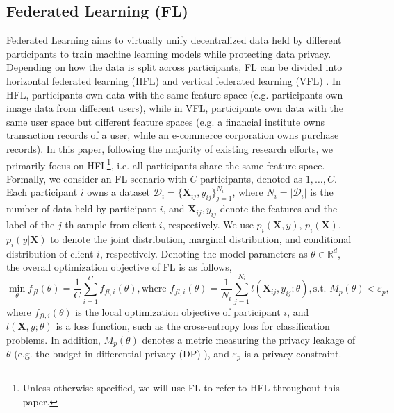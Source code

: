 \documentclass[11pt]{article}
\begin{document}
\subsection{Federated Learning (FL)}\label{sec:prelim-fl}
Federated Learning aims to virtually unify decentralized data held by different participants to train machine learning models while protecting data privacy. Depending on how the data is split across participants, FL can be divided into horizontal federated learning (HFL) and vertical federated learning (VFL) \cite{Yilun-yang2019federated}. In HFL, participants own data with the same feature space (e.g. participants own image data from different users), while in VFL, participants own data with the same user space but different feature spaces (e.g. a financial institute owns transaction records of a user, while an e-commerce corporation owns purchase records). In this paper, following the majority of existing research efforts, we primarily focus on HFL\footnote{Unless otherwise specified, we will use FL to refer to HFL throughout this paper. }, i.e. all participants share the same feature space. Formally, we consider an FL scenario with $C$ participants, denoted as $1, \dots, C$. Each participant $i$ owns a dataset $\mathcal{D}_i=\{\mathbf{X}_{ij}, y_{ij}\}_{j=1}^{N_i}$, where $N_i=|\mathcal{D}_i|$ is the number of data held by participant $i$, and $\mathbf{X}_{ij}, y_{ij}$ denote the features and the label of the $j$-th sample from client $i$, respectively. We use $p_i(\mathbf{X}, y)$, $p_i(\mathbf{X})$, $p_i(y|\mathbf{X})$ to denote the joint distribution, marginal distribution, and conditional distribution of client $i$, respectively. Denoting the model parameters as $\theta\in \mathbb{R}^d$, the overall optimization objective of FL is as follows,
\begin{equation}
    \min_{\theta} f_{fl}(\theta) = \frac{1}{C}\sum_{i=1}^C f_{fl, i}(\theta), \text{where } f_{fl, i}(\theta) =\frac{1}{N_i}\sum_{j=1}^{N_i}l\left(\mathbf{X}_{ij}, y_{ij};\theta\right), \text{s.t. } M_p(\theta)< \varepsilon_p,
\label{eqn:fl}
\end{equation}
where $f_{fl, i}(\theta)$ is the local optimization objective of participant $i$, and $l(\mathbf{X}, y;\theta)$ is a loss function, such as the cross-entropy loss for classification problems. In addition, $M_p(\theta)$ denotes a metric measuring the privacy leakage of $\theta$ (e.g. the budget in differential privacy (DP) \cite{Yilun-dwork2014algorithmic}), and $\varepsilon_p$ is a privacy constraint.
\end{document}
